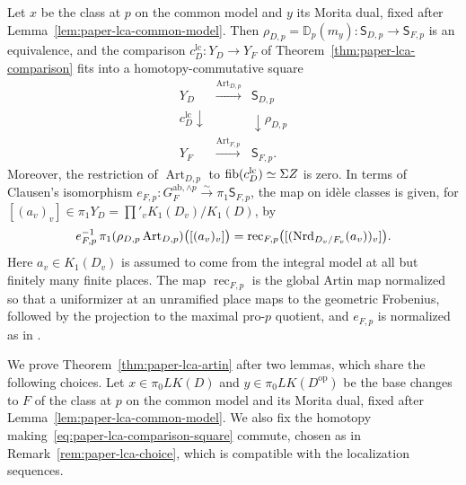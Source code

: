 \begin{theorem}\label{thm:paper-lca-artin}
Let $x$ be the class at $p$ on the common model and $y$ its Morita dual, fixed after Lemma~\ref{lem:paper-lca-common-model}.
Then $\rho_{D,p}=\mathbb D_p(m_y)\colon\mathsf S_{D,p}\to\mathsf S_{F,p}$ is an equivalence, and the comparison $c^{\mathrm{lc}}_D\colon Y_D\to Y_F$ of Theorem~\ref{thm:paper-lca-comparison} fits into a homotopy-commutative square
\begin{equation}\label{eq:paper-lca-artin-square}
 \begin{array}{ccc}
 Y_D&\xrightarrow{\operatorname{Art}_{D,p}}&\mathsf S_{D,p}\\
 {\scriptstyle c^{\mathrm{lc}}_D}\downarrow&&\downarrow{\scriptstyle\rho_{D,p}}\\
 Y_F&\xrightarrow{\operatorname{Art}_{F,p}}&\mathsf S_{F,p}.
 \end{array}
\end{equation}
Moreover, the restriction of $\operatorname{Art}_{D,p}$ to $\operatorname{fib}(c^{\mathrm{lc}}_D)\simeq\Sigma Z$ is zero.
In terms of Clausen's isomorphism $e_{F,p}\colon G_F^{\mathrm{ab},\wedge p} \xrightarrow{\sim}\pi_1\mathsf S_{F,p}$, the map on id\`ele classes is given, for $[(a_v)_v]\in\pi_1Y_D=\prod'_vK_1(D_v)/K_1(D)$, by
\begin{equation}\label{eq:paper-lca-reduced-artin}
 e_{F,p}^{-1}\,\pi_1(\rho_{D,p}\operatorname{Art}_{D,p})
 \bigl([(a_v)_v]\bigr)
 =
 \operatorname{rec}_{F,p}
 \bigl([(\operatorname{Nrd}_{D_v/F_v}(a_v))_v]\bigr).
\end{equation}
Here $a_v\in K_1(D_v)$ is assumed to come from the integral model at all but finitely many finite places.
The map $\operatorname{rec}_{F,p}$ is the global Artin map normalized so that a uniformizer at an unramified place maps to the geometric Frobenius, followed by the projection to the maximal pro-$p$ quotient, and $e_{F,p}$ is normalized as in \cite[Definition 2.37]{ClausenArtin}.
\end{theorem}

We prove Theorem~\ref{thm:paper-lca-artin} after two lemmas, which share the following choices.
Let $x\in\pi_0LK(D)$ and $y\in\pi_0LK(D^{\mathrm{op}})$ be the base changes to $F$ of the class at $p$ on the common model and its Morita dual, fixed after Lemma~\ref{lem:paper-lca-common-model}.
We also fix the homotopy making~\eqref{eq:paper-lca-comparison-square} commute, chosen as in Remark~\ref{rem:paper-lca-choice}, which is compatible with the localization sequences.

